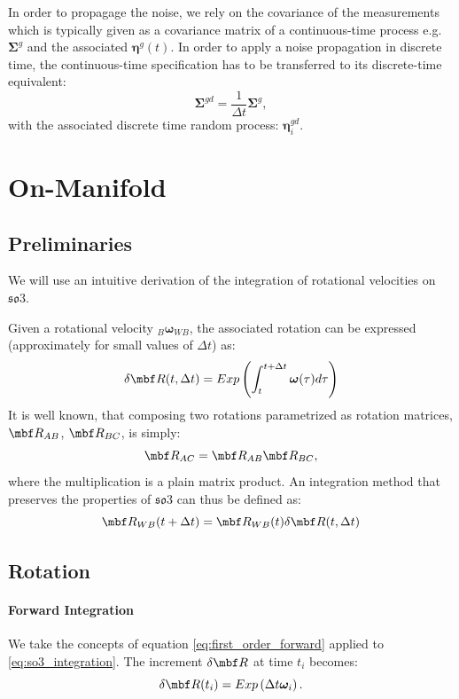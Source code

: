 \documentclass[10pt,a4paper]{article}
\newcommand{\mbs}[1]{{\boldsymbol{#1}}}
\numberwithin{equation}{section}
\begin{document}
In order to propagage the noise, we rely on the covariance of the measurements which is typically given as a covariance matrix of a continuous-time process e.g. $\mbs \Sigma^g$ and the associated $\mbs \eta^g(t)$. In order to apply a noise propagation in discrete time, the continuous-time specification has to be transferred to its discrete-time equivalent:
\begin{equation}
\mbs \Sigma^{gd} = \dfrac{1}{\Delta t} \mbs \Sigma^g,
\end{equation}
with the associated discrete time random process: $\mbs \eta^{gd}_i$.

\section{On-Manifold}

\subsection{Preliminaries}
We will use an intuitive derivation of the integration of rotational velocities on $\mathfrak{so}3$.

Given a rotational velocity $_B \mbs \omega_{WB}$, the associated rotation can be expressed (approximately for small values of $\Delta t$) as:
\begin{equation}
\delta \mbf R(t, \Delta t) = Exp \left( \int_t^{t + \Delta t} \mbs \omega(\tau) d\tau \right)
\end{equation}
It is well known, that composing two rotations parametrized as rotation matrices, $\mbf R_{AB}$, $\mbf R_{BC}$, is simply:
\begin{equation}
\mbf R_{AC} = \mbf R_{AB}\mbf R_{BC},
\end{equation}
where the multiplication is a plain matrix product.
An integration method that preserves the properties of $\mathfrak{so}3$ can thus be defined as:
\begin{equation}
\mbf R_{WB}(t + \Delta t) = \mbf R_{WB}(t) \delta \mbf R(t, \Delta t)
\label{eq:so3_integration}
\end{equation}

\subsection{Rotation}

\paragraph{Forward Integration}
We take the concepts of equation \eqref{eq:first_order_forward} applied to \eqref{eq:so3_integration}.
The increment $\delta \mbf R$ at time $t_i$ becomes:
\begin{equation}
\delta \mbf R(t_i) = Exp \left( \Delta t \mbs \omega_i\right).
\label{eq:manifold_forward}
\end{equation}
\end{document}
